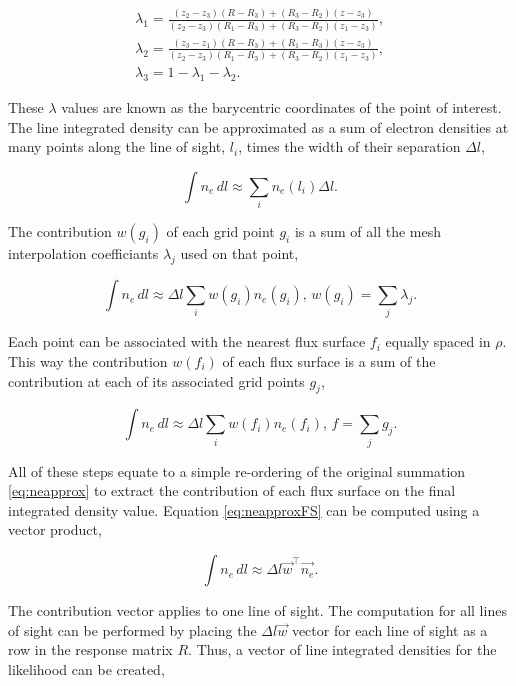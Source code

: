 \begin{gather}
\lambda_1 = \frac{(z_2 - z_3)(R - R_3) + (R_3 - R_2)(z - z_3)}{(z_2 - z_3)(R_1 - R_3) + (R_3 - R_2)(z_1 - z_3)},\\
\lambda_2 = \frac{(z_3 - z_1)(R - R_3) + (R_1 - R_3)(z - z_3)}{(z_2 - z_3)(R_1 - R_3) + (R_3 - R_2)(z_1 - z_3)},\\
\lambda_3 = 1-\lambda_1-\lambda_2.
\end{gather}

\noindent These $\lambda$ values are known as the barycentric coordinates of the point of interest. The line integrated density can be approximated as a sum of electron densities at many points along the line of sight, $l_i$, times the width of their separation $\Delta l$,

\begin{equation}
  \int n_e \, dl \approx \sum_i n_e(l_i) \Delta l.
  \label{eq:neapprox}
\end{equation}

\noindent The contribution $w(g_i)$ of each grid point $g_i$ is a sum of all the mesh interpolation coefficiants $\lambda_j$ used on that point,

\begin{equation}
  \int n_e \, dl \approx \Delta l \sum_i w(g_i) n_e(g_i), \, w(g_i) = \sum_j \lambda_j.
\end{equation}

\noindent Each point can be associated with the nearest flux surface $f_i$ equally spaced in $\rho$. This way the contribution $w(f_i)$ of each flux surface is a sum of the contribution at each of its associated grid points $g_j$,

\begin{equation}
  \int n_e \, dl \approx \Delta l \sum_i w(f_i) n_e(f_i), \, f = \sum_j g_j.
  \label{eq:neapproxFS}
\end{equation}

\noindent All of these steps equate to a simple re-ordering of the original summation \ref{eq:neapprox} to extract the contribution of each flux surface on the final integrated density value. Equation \ref{eq:neapproxFS} can be computed using a vector product,

\begin{equation}
  \int n_e \, dl \approx \Delta l \vec{w}^{\top} \vec{n_e}.
\end{equation}

\noindent The contribution vector applies to one line of sight. The computation for all lines of sight can be performed by placing the $\Delta l \vec{w}$ vector for each line of sight as a row in the response matrix $R$. Thus, a vector of line integrated densities for the likelihood can be created,

